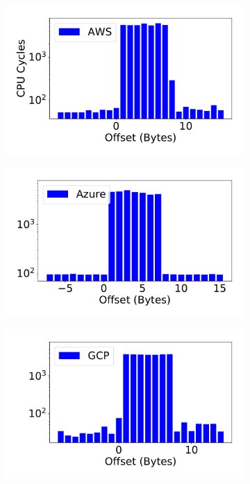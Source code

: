 \begin{figure}[h!]
  \begin{subfigure}{.33\textwidth}
    \centering
    \includegraphics[width=.99\linewidth]{fig/membus_aws.pdf}
  \end{subfigure}%
  \begin{subfigure}{.33\textwidth}
    \centering
    \includegraphics[width=.99\linewidth]{fig/membus_azure.pdf}
  \end{subfigure}
  \begin{subfigure}{.33\textwidth}
    \centering
    \includegraphics[width=.99\linewidth]{fig/membus_gcp.pdf}

\end{subfigure}
\end{figure}
